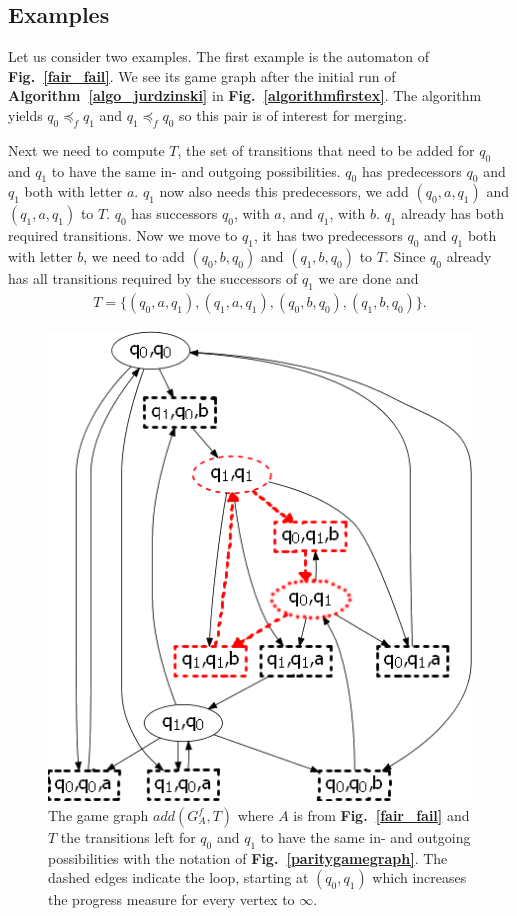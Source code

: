 \documentclass[12pt,oneside,bibliography=totoc,abstracton]{scrartcl}
\newcommand{\figref}[1]{\textbf{Fig.~\ref{#1}}}
\newcommand{\algoref}[1]{\textbf{Algorithm~\ref{#1}}}
\begin{document}
\subsection{Examples}
Let us consider two examples. The first example is the automaton of \figref{fair_fail}.
We see its game graph after the initial run of \algoref{algo_jurdzinski} in \figref{algorithmfirstex}.
The algorithm yields $q_0 \preceq_f q_1$ and $q_1 \preceq_f q_0$ so this pair is
of interest for merging.

Next we need to compute $T$, the set of transitions that need to be added for $q_0$ and $q_1$
to have the same in- and outgoing possibilities. $q_0$ has predecessors $q_0$ and $q_1$ both with
letter $a$. $q_1$ now also needs this predecessors, we add $(q_0, a, q_1)$ and $(q_1, a, q_1)$ to $T$.
$q_0$ has successors $q_0$, with $a$, and $q_1$, with $b$. $q_1$ already has both required transitions.
Now we move to $q_1$, it has two predecessors $q_0$ and $q_1$ both with letter $b$, we need to add
$(q_0, b, q_0)$ and $(q_1, b, q_0)$ to $T$. Since $q_0$ already has all transitions required by the
successors of $q_1$ we are done and
\begin{align*}
	T = \{(q_0, a, q_1), (q_1, a, q_1), (q_0, b, q_0), (q_1, b, q_0)\}.
\end{align*}
\begin{figure}[ht]
	 \begin{center}
		\includegraphics[scale=0.6]{res/fullalgorithm_firstex}
	\end{center}
	\caption{The game graph $add(G^f_A, T)$ where $A$ is from \figref{fair_fail} and $T$ the
		transitions left for $q_0$ and $q_1$ to have the same in- and outgoing possibilities
		with the notation of \figref{paritygamegraph}. The dashed edges indicate the loop,
		starting at $(q_0, q_1)$ which increases the progress
		measure for every vertex to $\infty$.}
	\label{fullalgorithmfirstex}
\end{figure}\quad\\
\end{document}
